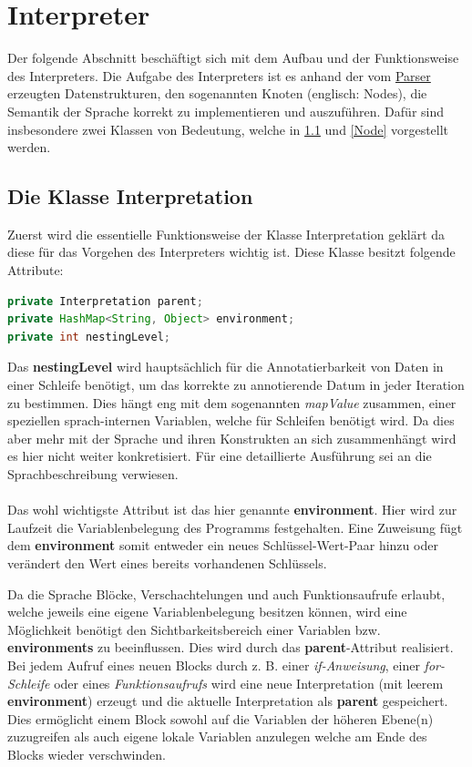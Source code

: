 \section{Interpreter}
\label{InterpreterIntro}
Der folgende Abschnitt beschäftigt sich mit dem Aufbau und der Funktionsweise des Interpreters. Die Aufgabe des Interpreters ist es anhand der vom \underline{Parser} erzeugten Datenstrukturen, den sogenannten Knoten (englisch: Nodes), die Semantik der Sprache korrekt zu implementieren und auszuführen. Dafür sind insbesondere zwei Klassen von Bedeutung, welche in \ref{Interpretation} und \ref{Node} vorgestellt werden.

\subsection{Die Klasse Interpretation}
\label{Interpretation}
Zuerst wird die essentielle Funktionsweise der Klasse Interpretation geklärt da diese für das Vorgehen des Interpreters wichtig ist.
Diese Klasse besitzt folgende Attribute:

\begin{lstlisting}[caption=Attribute der Klasse Interpretation, language=Java]
private Interpretation parent;
private HashMap<String, Object> environment;
private int nestingLevel;
\end{lstlisting}
Das \textbf{nestingLevel} wird hauptsächlich für die Annotatierbarkeit von Daten in einer Schleife benötigt, um das korrekte zu annotierende Datum in jeder Iteration zu bestimmen. Dies hängt eng mit dem sogenannten \textit{mapValue} zusammen, einer speziellen sprach-internen Variablen, welche für Schleifen benötigt wird. Da dies aber mehr mit der Sprache und ihren Konstrukten an sich zusammenhängt wird es hier nicht weiter konkretisiert. Für eine detaillierte Ausführung sei an die Sprachbeschreibung verwiesen.
\\\\
Das wohl wichtigste Attribut ist das hier genannte \textbf{environment}. Hier wird zur Laufzeit die Variablenbelegung des Programms festgehalten. Eine Zuweisung fügt dem \textbf{environment} somit entweder ein neues Schlüssel-Wert-Paar hinzu oder verändert den Wert eines bereits vorhandenen Schlüssels.

Da die Sprache Blöcke, Verschachtelungen und auch Funktionsaufrufe erlaubt, welche jeweils eine eigene Variablenbelegung besitzen können, wird eine Möglichkeit benötigt den Sichtbarkeitsbereich einer Variablen bzw. \textbf{environments}  zu beeinflussen. Dies wird durch das \textbf{parent}-Attribut realisiert. Bei jedem Aufruf eines neuen Blocks durch z. B. einer \textit{if-Anweisung}, einer \textit{for-Schleife} oder eines \textit{Funktionsaufrufs} wird eine neue Interpretation (mit leerem \textbf{environment}) erzeugt und die aktuelle Interpretation als \textbf{parent} gespeichert. Dies ermöglicht einem Block sowohl auf die Variablen der höheren Ebene(n) zuzugreifen als auch eigene lokale Variablen anzulegen welche am Ende des Blocks wieder verschwinden. 

